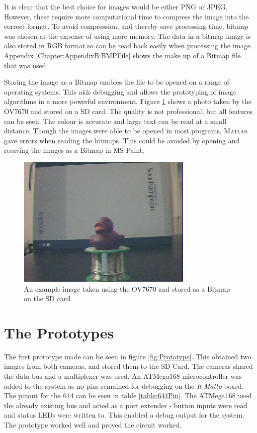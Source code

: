 It is clear that the best choice for images would be either PNG or JPEG. However, these require more computational time to compress the image into the correct format. To avoid compression, and thereby save processing time, bitmap was chosen at the expense of using more memory. The data in a bitmap image is also stored in RGB format so can be read back easily when processing the image. Appendix \ref{Chapter:AppendixB:BMPFile} shows the make up of a Bitmap file that was used.

Storing the image as a Bitmap enables the file to be opened on a range of operating systems. This aids debugging and allows the prototyping of image algorithms in a more powerful environment. Figure \ref{ExampleImage} shows a photo taken by the OV7670 and stored on a SD card. The quality is not professional, but all features can be seen. The colour is accurate and large text can be read at a small distance. Though the images were able to be opened in most programs, \textsc{Matlab} gave errors when reading the bitmaps. This could be avoided by opening and resaving the images as a Bitmap in MS Paint.

\begin{figure}
\begin{center}
\includegraphics{Figures/ExampleImageFromCamera.jpg} 
\end{center}
\caption{An example image taken using the OV7670 and stored as a Bitmap on the SD card}
\label{ExampleImage}
\end{figure}

\section{The Prototypes}

The first prototype made can be seen in figure \ref{fig:Prototype}. This obtained two images from both cameras, and stored them to the SD Card. The cameras shared the data bus and a \itc multiplexer was used. An ATMega168 microcontroller was added to the system as no pins remained for debugging on the \textit{Il Matto} board. The pinout for the 644 can be seen in table \ref{table:644Pin}. The ATMega168 used the already existing \itc bus and acted as a port extender - button inputs were read and status LEDs were written to. This enabled a debug output for the system. The prototype worked well and proved the circuit worked. 

